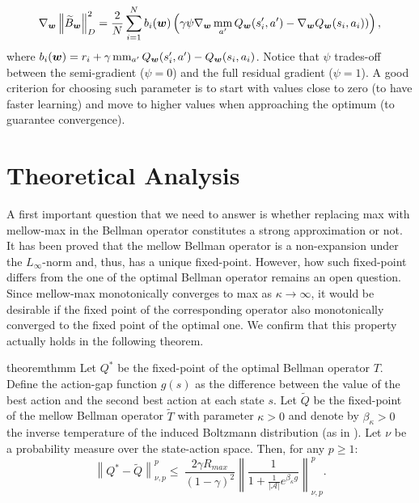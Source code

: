 \documentclass{article}
\newcommand{\mm}{\operatornamewithlimits{mm}}
\newcommand{\wt}[1]{\widetilde{#1}}
\newcommand{\norm}[1]{\left\lVert #1 \right\rVert}
\newcommand{\abs}[1]{\left\lvert #1 \right\rvert}
\begin{document}
\begin{equation}
\nabla_{\bm{w}}\norm{\wt{B}_{\bm{w}}}_{D}^2 = \frac{2}{N}\sum_{i=1}^N b_i(\bm{w})\left( \gamma\psi\nabla_{\bm{w}}\mm_{a'}Q_{\bm{w}}(s_i',a') - \nabla_{\bm{w}}Q_{\bm{w}}(s_i,a_i)) \right),
\end{equation}
where $b_i(\bm{w}) = r_i + \gamma\mm_{a'}Q_{\bm{w}}(s_i',a') - Q_{\bm{w}}(s_i,a_i)$. Notice that $\psi$ trades-off between the semi-gradient ($\psi = 0$) and the full residual gradient ($\psi = 1$). A good criterion for choosing such parameter is to start with values close to zero (to have faster learning) and move to higher values when approaching the optimum (to guarantee convergence).

\section{Theoretical Analysis}\label{sec:theory}

A first important question that we need to answer is whether replacing max with mellow-max in the Bellman operator constitutes a strong approximation or not. It has been proved \cite{asadi2017alternative} that the mellow Bellman operator is a non-expansion under the $L_{\infty}$-norm and, thus, has a unique fixed-point.  However, how such fixed-point differs from the one of the optimal Bellman operator remains an open question. Since mellow-max monotonically converges to max as $\kappa \rightarrow \infty$, it would be desirable if the fixed point of the corresponding operator also monotonically converged to the fixed point of the optimal one. We confirm that this property actually holds in the following theorem.

\begin{restatable}{theorem}{thmm} \label{th:mm}
Let $Q^*$ be the fixed-point of the optimal Bellman operator $T$. Define the action-gap function $g(s)$ as the difference between the value of the best action and the second best action at each state $s$. Let $\wt{Q}$ be the fixed-point of the mellow Bellman operator $\wt{T}$ with parameter $\kappa > 0$ and denote by $\beta_{\kappa} > 0$ the inverse temperature of the induced Boltzmann distribution (as in \cite{asadi2017alternative}). Let $\nu$ be a probability measure over the state-action space. Then, for any $p \geq 1$:
\begin{equation}
\norm{Q^*-\wt{Q}}_{\nu,p}^p \leq\ \frac{2\gamma R_{max}}{(1-\gamma)^2}\norm{\frac{1}{1 + \frac{1}{\abs{\mathcal{A}}}e^{\beta_{\kappa} g}}}_{\nu,p}^p.
\end{equation}
\end{restatable}
\end{document}
